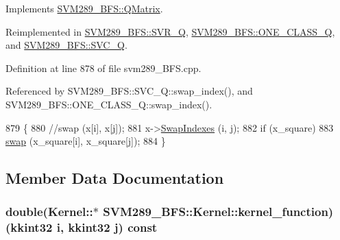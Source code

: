 Implements \hyperlink{class_s_v_m289___b_f_s_1_1_q_matrix_a49485150269598921a3a53bae3158c30}{S\+V\+M289\+\_\+\+B\+F\+S\+::\+Q\+Matrix}.



Reimplemented in \hyperlink{class_s_v_m289___b_f_s_1_1_s_v_r___q_af59859cc6164180ac249b6e01ff309a7}{S\+V\+M289\+\_\+\+B\+F\+S\+::\+S\+V\+R\+\_\+Q}, \hyperlink{class_s_v_m289___b_f_s_1_1_o_n_e___c_l_a_s_s___q_ab35df03535908bed2a005d9bbf6d427a}{S\+V\+M289\+\_\+\+B\+F\+S\+::\+O\+N\+E\+\_\+\+C\+L\+A\+S\+S\+\_\+Q}, and \hyperlink{class_s_v_m289___b_f_s_1_1_s_v_c___q_a4ff1abb91d8345093e6e66c01a09bb33}{S\+V\+M289\+\_\+\+B\+F\+S\+::\+S\+V\+C\+\_\+Q}.



Definition at line 878 of file svm289\+\_\+\+B\+F\+S.\+cpp.



Referenced by S\+V\+M289\+\_\+\+B\+F\+S\+::\+S\+V\+C\+\_\+\+Q\+::swap\+\_\+index(), and S\+V\+M289\+\_\+\+B\+F\+S\+::\+O\+N\+E\+\_\+\+C\+L\+A\+S\+S\+\_\+\+Q\+::swap\+\_\+index().


\begin{DoxyCode}
879   \{
880     \textcolor{comment}{//swap (x[i], x[j]);}
881     x->\hyperlink{class_k_k_b_1_1_k_k_queue_a7a848286a5d2ddd9b0d320557a458f66}{SwapIndexes} (i, j);
882     \textcolor{keywordflow}{if}  (x\_square) 
883       \hyperlink{namespace_s_v_m289___b_f_s_ab3100b6a2a7917c5fb6ef6aae0af496f}{swap} (x\_square[i], x\_square[j]);
884   \}
\end{DoxyCode}


\subsection{Member Data Documentation}
\subsubsection[{\texorpdfstring{kernel\+\_\+function}{kernel_function}}]{\setlength{\rightskip}{0pt plus 5cm}double(Kernel\+::$\ast$ S\+V\+M289\+\_\+\+B\+F\+S\+::\+Kernel\+::kernel\+\_\+function) ({\bf kkint32} i, {\bf kkint32} j) const \hspace{0.3cm}{\ttfamily [protected]}}\hypertarget{class_s_v_m289___b_f_s_1_1_kernel_a53bab2e9f1cf2a9c8ade1e80237cda65}{}\label{class_s_v_m289___b_f_s_1_1_kernel_a53bab2e9f1cf2a9c8ade1e80237cda65}


